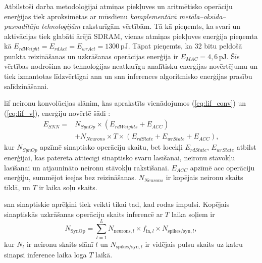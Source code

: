 Atbilstoši darba \cite{horowitz2014} metodoloģijai atmiņas piekļuves un aritmētisko operāciju enerģijas tiek aproksimētas ar
mūsdienu \textit{komplementārā metāla–oksīda–pusvadītāju tehnoloģijām}  raksturīgām vērtībām. Tā kā pieņemts, ka svari un aktivācijas tiek glabāti ārējā SDRAM,
vienas atmiņas piekļuves enerģija pieņemta kā \(E_{rdWeight}=E_{rdAct}=E_{wrAct}=1300\,\mathrm{pJ}\). Tāpat pieņemts, ka 32
bitu peldošā punkta reizināšanas un uzkrāšanas operācijas enerģija ir \(E_{MAC}=4{,}6\,\mathrm{pJ}\). Šīs vērtības nodrošina no tehnoloģijas neatkarīgu analītisku enerģijas novērtējumu un tiek izmantotas līdzvērtīgai \Gls{ann} un \Gls{snn} inferences algoritmisko enerģijas prasību salīdzināšanai.

\Gls{lif} neironu konvolūcijas slānim, kas aprakstīts vienādojumos (\ref{eq:lif_conv}) un (\ref{eq:lif_v}), enerģiju novērtē šādi \cite{dampfhoffer2022}:
\begin{equation}
\begin{split}
  E_{SNN} = & N_{SynOp} \times (E_{rdWeights} + E_{ACC}) \\
            & + N_{Neurons} \times T \times (E_{rdState} + E_{wrState} + E_{ACC}),
\end{split}
\label{eq:esnn}
\end{equation}
kur \(N_{SynOp}\) apzīmē sinaptisko operāciju skaitu, bet locekļi \(E_{rdState}\), \(E_{wrState}\) atbilst enerģijai, kas patērēta attiecīgi sinaptisko svaru lasīšanai, neironu stāvokļu lasīšanai un atjaunināto neironu stāvokļu rakstīšanai. \(E_{ACC}\) apzīmē \Gls{acc} operāciju enerģiju, summējot ieejas bez reizināšanas. \(N_{Neurons}\) ir kopējais neironu skaits tīklā, un \(T\) ir laika soļu skaits.

\Gls{snn} sinaptiskie aprēķini tiek veikti tikai tad, kad rodas impulsi. Kopējais sinaptiskās uzkrāšanas operāciju skaits
inferencē ar \(T\) laika soļiem ir \cite{rueckauer2017}
\begin{equation}
    N_{\mathrm{SynOp}} =
    \sum_{l=1}^{L}
    N_{\mathrm{neurons},l} \times
    f_{\mathrm{in},l} \times
    N_{\mathrm{spikes/syn},l},
    \label{eq:snn_synops}
\end{equation}
kur \(N_l\) ir neironu skaits slānī \(l\) un \(N_{\mathrm{spikes/syn},l}\) ir vidējais pulsu skaits uz katru sinapsi
inference laika loga \(T\) laikā.

